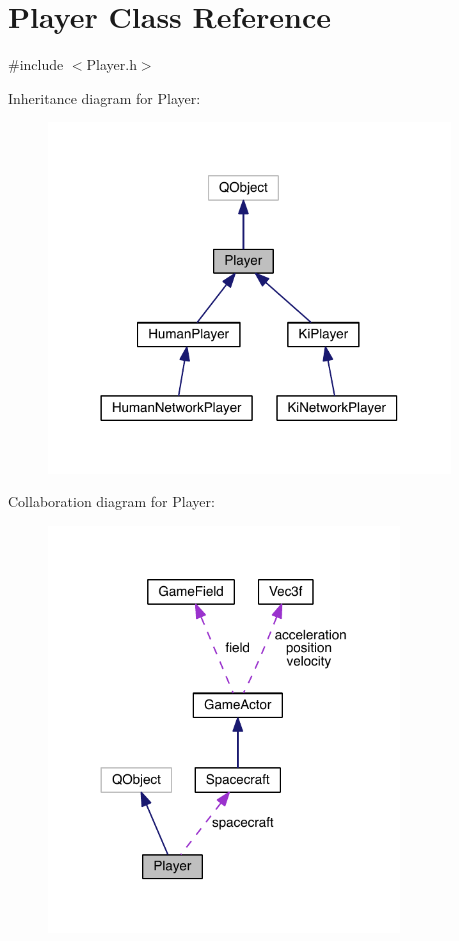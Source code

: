 \hypertarget{class_player}{\section{Player Class Reference}
\label{class_player}
}


{\ttfamily \#include $<$Player.\+h$>$}



Inheritance diagram for Player\+:\nopagebreak
\begin{figure}[H]
\begin{center}
\leavevmode
\includegraphics[width=302pt]{class_player__inherit__graph}
\end{center}
\end{figure}


Collaboration diagram for Player\+:\nopagebreak
\begin{figure}[H]
\begin{center}
\leavevmode
\includegraphics[width=264pt]{class_player__coll__graph}
\end{center}
\end{figure}
